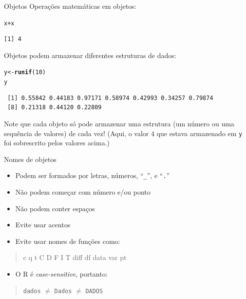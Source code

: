 \documentclass[10pt,handout]{beamer}\usepackage[]{graphicx}\usepackage[]{color}
\makeatletter
\newcommand{\hlnum}[1]{\textcolor[rgb]{0.686,0.059,0.569}{#1}}%
\newcommand{\hlopt}[1]{\textcolor[rgb]{0,0,0}{#1}}%
\newcommand{\hlstd}[1]{\textcolor[rgb]{0.345,0.345,0.345}{#1}}%
\newcommand{\hlkwb}[1]{\textcolor[rgb]{0.69,0.353,0.396}{#1}}%
\newcommand{\hlkwd}[1]{\textcolor[rgb]{0.282,0.239,0.545}{\textbf{#1}}}%
\newenvironment{kframe}{%
 \def\at@end@of@kframe{}%
 \ifinner\ifhmode%
  \def\at@end@of@kframe{\end{minipage}}%
  \begin{minipage}{\columnwidth}%
 \fi\fi%
 \def\FrameCommand##1{\hskip\@totalleftmargin \hskip-\fboxsep
 \colorbox{shadecolor}{##1}\hskip-\fboxsep
     \hskip-\linewidth \hskip-\@totalleftmargin \hskip\columnwidth}%
 \MakeFramed {\advance\hsize-\width
   \@totalleftmargin\z@ \linewidth\hsize
   \@setminipage}}%
 {\par\unskip\endMakeFramed%
 \at@end@of@kframe}
\newenvironment{knitrout}{}{} %
\makeatother
\begin{document}
\begin{frame}[fragile]{Objetos}
Operações matemáticas em objetos:
\begin{knitrout}\small
{}\color{fgcolor}\begin{kframe}
\begin{alltt}
\hlstd{x} \hlopt{+} \hlstd{x}
\end{alltt}
\begin{verbatim}
[1] 4
\end{verbatim}
\end{kframe}
\end{knitrout}

Objetos podem armazenar diferentes estruturas de dados:
\begin{knitrout}\small
{}\color{fgcolor}\begin{kframe}
\begin{alltt}
\hlstd{y} \hlkwb{<-} \hlkwd{runif}\hlstd{(}\hlnum{10}\hlstd{)}
\hlstd{y}
\end{alltt}
\begin{verbatim}
 [1] 0.55842 0.44183 0.97171 0.58974 0.42993 0.34257 0.79874
 [8] 0.21318 0.44120 0.22809
\end{verbatim}
\end{kframe}
\end{knitrout}

Note que cada objeto só pode armazenar uma estrutura (um número ou uma
sequência de valores) de cada vez! (Aqui, o valor $4$ que estava
armazenado em \verb|y| foi sobrescrito pelos valores acima.)
\end{frame}

\begin{frame}[fragile]{Nomes de objetos}
\begin{itemize}
\item Podem ser formados por letras, números, ``\verb|_|'', e
  ``\texttt{.}''
\item Não podem começar com número e/ou ponto
\item Não podem conter espaços
\item Evite usar acentos
\item Evite usar nomes de funções como:
\end{itemize}
\begin{quote}
\begin{center}
\ttfamily \upshape
c q t C D F I T diff df data var pt
\end{center}
\end{quote}
\begin{itemize}
\item O R é \emph{case-sensitive}, portanto:
\end{itemize}
\begin{quote}
\begin{center}
\ttfamily \upshape
\texttt{dados} $\neq$ \texttt{Dados} $\neq$ \texttt{DADOS}
\end{center}
\end{quote}
\end{frame}
\end{document}
